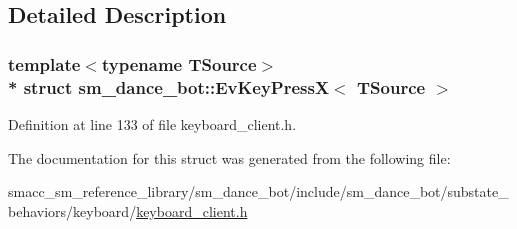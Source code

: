 \subsection{Detailed Description}
\subsubsection*{template$<$typename T\+Source$>$\\*
struct sm\+\_\+dance\+\_\+bot\+::\+Ev\+Key\+Press\+X$<$ T\+Source $>$}



Definition at line 133 of file keyboard\+\_\+client.\+h.



The documentation for this struct was generated from the following file\+:\begin{DoxyCompactItemize}
\item 
smacc\+\_\+sm\+\_\+reference\+\_\+library/sm\+\_\+dance\+\_\+bot/include/sm\+\_\+dance\+\_\+bot/substate\+\_\+behaviors/keyboard/\hyperlink{keyboard__client_8h}{keyboard\+\_\+client.\+h}\end{DoxyCompactItemize}
